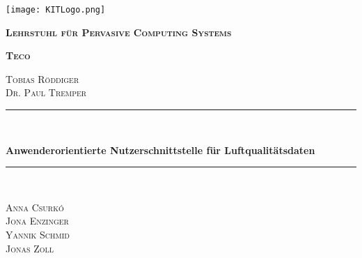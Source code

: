 \begin{titlepage}
  \centering
  \texttt{[image: KITLogo.png]}\par\vspace{1cm}
	  {\scshape \bfseries Lehrstuhl für Pervasive Computing Systems\par}
	  {\scshape \bfseries Teco\par}
	  \vspace{0.25cm}
  	{\scshape Tobias Röddiger\\Dr. Paul Tremper\par}
  	\vspace{1.5cm}

    \newcommand{\HRule}{\rule{\linewidth}{0.5mm}}
    {\color{mintgreen}\HRule} \\[0.4cm]
  	{\huge \bfseries \LARGE Anwenderorientierte Nutzerschnittstelle für Luftqualitätsdaten\par}
    {\color{mintgreen}\HRule} \\[1cm]
  	\vspace{2cm}
  	{\scshape \Large Anna Csurkó\\Jona Enzinger\\Yannik Schmid\\Jonas Zoll\par}
  	\vfill

\end{titlepage}
